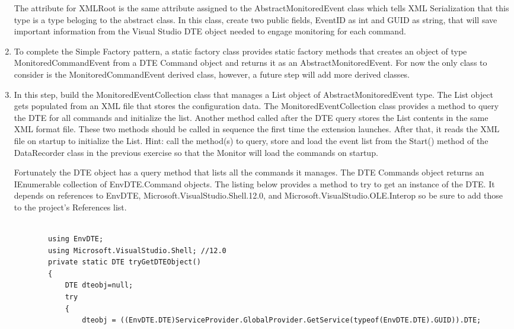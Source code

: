\begin{Exercise}[ type={program}, difficulty={1}]
\begin{enumerate}
 The attribute for XMLRoot is the same attribute assigned to the AbstractMonitoredEvent class which tells XML Serialization that this type is a type beloging to the abstract class.  In this class, create two public fields, EventID as int and GUID as string, that will save important information from the Visual Studio DTE object needed to engage monitoring for each command.  

\item
To complete the Simple Factory pattern, a static factory class provides static factory methods that creates an object of type  MonitoredCommandEvent from a DTE Command object and returns it as an AbstractMonitoredEvent.  For now the only class to consider is the MonitoredCommandEvent derived class, however, a future step will add more derived classes.  

\item
In this step, build the MonitoredEventCollection class that manages a List object of AbstractMonitoredEvent type.  The List object gets populated from an XML file that stores the configuration data.  The MonitoredEventCollection class provides a method to query the DTE for all commands and initialize the list.  Another method called after the DTE query stores the List contents in the same XML format file.  These two methods should be called in sequence the first time the extension launches. After that, it  reads the XML file on startup to initialize the List.  Hint: call the method(s) to query, store and load the event list from the Start() method of the DataRecorder class in the previous exercise so that the Monitor will load the commands on startup.

Fortunately the DTE object has a query method that lists all the commands it manages.   The DTE Commands object returns an IEnumerable collection of EnvDTE.Command objects. The listing below provides a method to try to get an instance of the DTE.  It depends on references to EnvDTE, Microsoft.VisualStudio.Shell.12.0, and Microsoft.VisualStudio.OLE.Interop so be sure to add those to the project's References list.

\begin{lstlisting}

		using EnvDTE;
		using Microsoft.VisualStudio.Shell; //12.0
		private static DTE tryGetDTEObject()
		{
			DTE dteobj=null;
			try
			{
				dteobj = ((EnvDTE.DTE)ServiceProvider.GlobalProvider.GetService(typeof(EnvDTE.DTE).GUID)).DTE;


\end{lstlisting}
\end{enumerate}
\end{Exercise}
